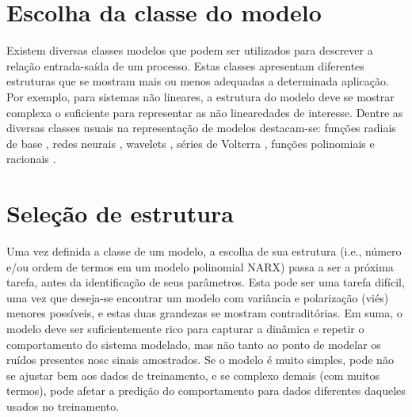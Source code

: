 \section{Escolha da classe do modelo}\label{sec:escolha_modelo}

Existem diversas classes modelos que podem ser utilizados para descrever a relação entrada-saída de um processo. Estas classes apresentam diferentes estruturas que se mostram mais ou menos adequadas a determinada aplicação. Por exemplo, para sistemas não lineares, a estrutura do modelo deve se mostrar complexa o suficiente para representar as não linearedades de interesse. Dentre as diversas classes usuais na representação de modelos destacam-se: funções radiais de base \citep{broomhead1988}, redes neurais \citep{haykin1994}, wavelets \citep{strang1989}, séries de Volterra \citep{billings1980}, funções polinomiais e racionais \citep{billings1989}.

\section{Seleção de estrutura}\label{sec:estr_selection}

Uma vez definida a classe de um modelo, a escolha de sua estrutura (i.e., número e/ou ordem de termos em um modelo polinomial NARX) passa a ser a próxima tarefa, antes da identificação de seus parâmetros.
Esta pode ser uma tarefa difícil, uma vez que deseja-se encontrar um modelo com variância e polarização (viés) menores possíveis, e estas duas grandezas se mostram contraditórias. 
Em suma, o modelo deve ser suficientemente rico para capturar a dinâmica e repetir o comportamento do sistema modelado, mas não tanto ao ponto de modelar os ruídos  presentes nosc sinais amostrados.
Se o modelo é muito simples, pode não se ajustar bem aos dados de treinamento, e se complexo demais (com muitos termos), pode afetar a predição do comportamento para dados diferentes daqueles usados no treinamento.

